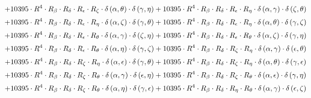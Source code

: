 \begin{subequations}
\begin{gather}
 \\[0.2em] \notag 		 + 10395 \cdot R^{4} \cdot R_{\beta{}} \cdot R_{\delta{}} \cdot R_{\epsilon{}} \cdot R_{\zeta{}} \cdot \delta{}\left(\alpha{}, \theta{}\right) \cdot \delta{}\left(\gamma{}, \eta{}\right)+ 10395 \cdot R^{4} \cdot R_{\beta{}} \cdot R_{\delta{}} \cdot R_{\epsilon{}} \cdot R_{\eta{}} \cdot \delta{}\left(\alpha{}, \gamma{}\right) \cdot \delta{}\left(\zeta{}, \theta{}\right) 
 \\[0.2em] \notag 		 + 10395 \cdot R^{4} \cdot R_{\beta{}} \cdot R_{\delta{}} \cdot R_{\epsilon{}} \cdot R_{\eta{}} \cdot \delta{}\left(\alpha{}, \zeta{}\right) \cdot \delta{}\left(\gamma{}, \theta{}\right)+ 10395 \cdot R^{4} \cdot R_{\beta{}} \cdot R_{\delta{}} \cdot R_{\epsilon{}} \cdot R_{\eta{}} \cdot \delta{}\left(\alpha{}, \theta{}\right) \cdot \delta{}\left(\gamma{}, \zeta{}\right) 
 \\[0.2em] \notag 		 + 10395 \cdot R^{4} \cdot R_{\beta{}} \cdot R_{\delta{}} \cdot R_{\epsilon{}} \cdot R_{\theta{}} \cdot \delta{}\left(\alpha{}, \gamma{}\right) \cdot \delta{}\left(\zeta{}, \eta{}\right)+ 10395 \cdot R^{4} \cdot R_{\beta{}} \cdot R_{\delta{}} \cdot R_{\epsilon{}} \cdot R_{\theta{}} \cdot \delta{}\left(\alpha{}, \zeta{}\right) \cdot \delta{}\left(\gamma{}, \eta{}\right) 
 \\[0.2em] \notag 		 + 10395 \cdot R^{4} \cdot R_{\beta{}} \cdot R_{\delta{}} \cdot R_{\epsilon{}} \cdot R_{\theta{}} \cdot \delta{}\left(\alpha{}, \eta{}\right) \cdot \delta{}\left(\gamma{}, \zeta{}\right)+ 10395 \cdot R^{4} \cdot R_{\beta{}} \cdot R_{\delta{}} \cdot R_{\zeta{}} \cdot R_{\eta{}} \cdot \delta{}\left(\alpha{}, \gamma{}\right) \cdot \delta{}\left(\epsilon{}, \theta{}\right) 
 \\[0.2em] \notag 		 + 10395 \cdot R^{4} \cdot R_{\beta{}} \cdot R_{\delta{}} \cdot R_{\zeta{}} \cdot R_{\eta{}} \cdot \delta{}\left(\alpha{}, \epsilon{}\right) \cdot \delta{}\left(\gamma{}, \theta{}\right)+ 10395 \cdot R^{4} \cdot R_{\beta{}} \cdot R_{\delta{}} \cdot R_{\zeta{}} \cdot R_{\eta{}} \cdot \delta{}\left(\alpha{}, \theta{}\right) \cdot \delta{}\left(\gamma{}, \epsilon{}\right) 
 \\[0.2em] \notag 		 + 10395 \cdot R^{4} \cdot R_{\beta{}} \cdot R_{\delta{}} \cdot R_{\zeta{}} \cdot R_{\theta{}} \cdot \delta{}\left(\alpha{}, \gamma{}\right) \cdot \delta{}\left(\epsilon{}, \eta{}\right)+ 10395 \cdot R^{4} \cdot R_{\beta{}} \cdot R_{\delta{}} \cdot R_{\zeta{}} \cdot R_{\theta{}} \cdot \delta{}\left(\alpha{}, \epsilon{}\right) \cdot \delta{}\left(\gamma{}, \eta{}\right) 
 \\[0.2em] \notag 		 + 10395 \cdot R^{4} \cdot R_{\beta{}} \cdot R_{\delta{}} \cdot R_{\zeta{}} \cdot R_{\theta{}} \cdot \delta{}\left(\alpha{}, \eta{}\right) \cdot \delta{}\left(\gamma{}, \epsilon{}\right)+ 10395 \cdot R^{4} \cdot R_{\beta{}} \cdot R_{\delta{}} \cdot R_{\eta{}} \cdot R_{\theta{}} \cdot \delta{}\left(\alpha{}, \gamma{}\right) \cdot \delta{}\left(\epsilon{}, \zeta{}\right) 

\end{gather}
\end{subequations}
